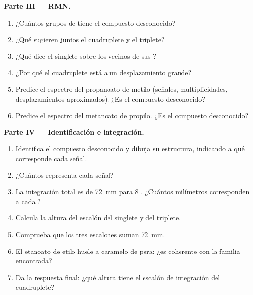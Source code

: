 \begin{problem}
\medskip
\noindent\textbf{Parte III --- RMN.}
\begin{enumerate}[resume]
  \item ¿Cuántos grupos de  tiene el compuesto
        desconocido?
  \item ¿Qué sugieren juntos el cuadruplete y el triplete?
  \item ¿Qué dice el singlete sobre los vecinos de sus ?
  \item ¿Por qué el cuadruplete está a un desplazamiento grande?
  \item Predice el espectro del propanoato de metilo 
        (señales, multiplicidades, desplazamientos aproximados). ¿Es el
        compuesto desconocido?
  \item Predice el espectro del metanoato de propilo. ¿Es el compuesto
        desconocido?
\end{enumerate}

\medskip
\noindent\textbf{Parte IV --- Identificación e integración.}
\begin{enumerate}[resume]
  \item Identifica el compuesto desconocido y dibuja su estructura,
        indicando a qué corresponde cada señal.
  \item ¿Cuántos  representa cada señal?
  \item La integración total es de \qty{72}{mm} para 8 . ¿Cuántos
        milímetros corresponden a cada ?
  \item Calcula la altura del escalón del singlete y del triplete.
  \item Comprueba que los tres escalones suman \qty{72}{mm}.
  \item El etanoato de etilo huele a caramelo de pera: ¿es coherente con
        la familia encontrada?
  \item Da la respuesta final: ¿qué altura tiene el escalón de
        integración del cuadruplete?
\end{enumerate}
\end{problem}
